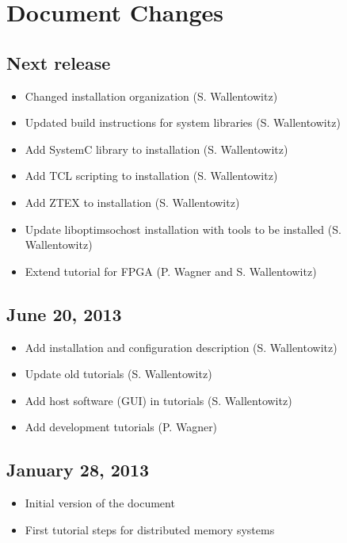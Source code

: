 \section*{Document Changes}


\subsection*{Next release} %
\begin{itemize}
\item Changed installation organization (S. Wallentowitz)
\item Updated build instructions for system libraries (S. Wallentowitz)
\item Add SystemC library to installation (S. Wallentowitz)
\item Add TCL scripting to installation (S. Wallentowitz)
\item Add ZTEX to installation (S. Wallentowitz)
\item Update liboptimsochost installation with tools to be installed
  (S. Wallentowitz)
\item Extend tutorial for FPGA (P. Wagner and S. Wallentowitz)
\end{itemize}

\subsection*{June 20, 2013}
\begin{itemize}
\item Add installation and configuration description (S. Wallentowitz)
\item Update old tutorials (S. Wallentowitz)
\item Add host software (GUI) in tutorials (S. Wallentowitz)
\item Add development tutorials (P. Wagner) 
\end{itemize}

\subsection*{January 28, 2013}
\begin{itemize}
\item Initial version of the document
\item First tutorial steps for distributed memory systems
\end{itemize}